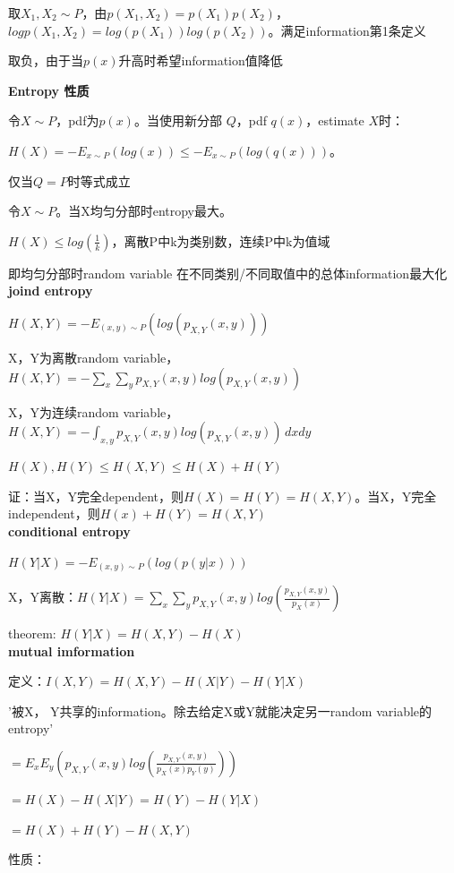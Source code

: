 \documentclass[UTF8]{ctexart}
\begin{document}
  \quad 取$X_1, X_2 \sim P$，由$p(X_1, X_2) = p(X_1)p(X_2)$，$logp(X_1, X_2) = log(p(X_1))log(p(X_2))$。满足information第1条定义
  
  \quad 取负，由于当$p(x)$升高时希望information值降低

  \textbf{Entropy 性质}

  \quad 令$X \sim P$，pdf为$p(x)$。当使用新分部 $Q$，pdf $q(x)$，estimate $X$时：

  \quad \quad $H(X) = -E_{x \sim P}(log(x)) \leq -E_{x \sim P}(log(q(x)))$。

  \quad \quad 仅当$Q = P$时等式成立

  \quad 令$X \sim P$。当X均匀分部时entropy最大。

  \quad \quad $H(X) \leq log(\frac{1}{k})$，离散P中k为类别数，连续P中k为值域

  \quad \quad 即均匀分部时random variable 在不同类别/不同取值中的总体information最大化\\
\textbf{joind entropy}

  $H(X, Y) = -E_{(x, y) \sim P}(log(p_{X, Y}(x, y)))$

  X，Y为离散random variable，$H(X, Y) = -\sum_x\sum_yp_{X, Y}(x, y)log(p_{X, Y}(x, y))$

  X，Y为连续random variable，$H(X, Y) = -\int_{x, y} p_{X, Y}(x, y)log(p_{X, Y}(x, y)) \,dxdy$

  $H(X), H(Y) \leq H(X, Y) \leq H(X) + H(Y)$
  
  \quad 证：当X，Y完全dependent，则$H(X) = H(Y) = H(X, Y)$。当X，Y完全independent，则$H(x) + H(Y) = H(X, Y)$\\
\textbf{conditional entropy}

  $H(Y | X) = -E_{(x, y) \sim P}(log(p(y | x)))$

  X，Y离散：$H(Y | X) = \sum_x\sum_yp_{X, Y}(x, y)log(\frac{p_{X, Y}(x, y)}{p_X(x)})$

  theorem: $H(Y | X) = H(X, Y) - H(X)$\\
\textbf{mutual imformation}

  定义：$I(X, Y) = H(X, Y) - H(X | Y) - H(Y | X)$

  \quad '被X， Y共享的information。除去给定X或Y就能决定另一random variable的entropy'

  \quad $ = E_xE_y(p_{X, Y}(x, y)log(\frac{p_{X, Y}(x, y)}{p_X(x)p_Y(y)}))$

  \quad $ = H(X) - H(X | Y) = H(Y) - H(Y | X)$

  \quad $ = H(X) + H(Y) - H(X, Y)$

  性质：
\end{document}
